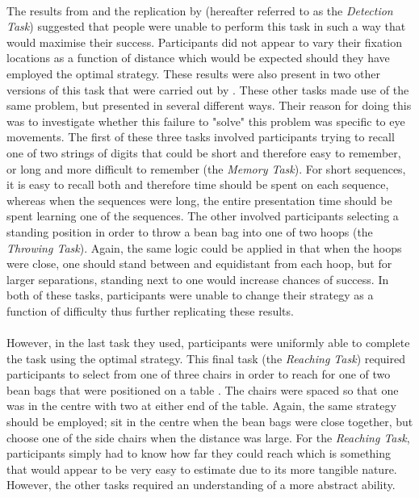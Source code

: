 \documentclass[12pt]{article}
\begin{document}
\paragraph{} The results from \cite{morvan2012human} and the replication by \cite{clarke2015failure} (hereafter referred to as the \textit{Detection Task}) suggested that people were unable to perform this task in such a way that would maximise their success. Participants did not appear to vary their fixation locations as a function of distance which would be expected should they have employed the optimal strategy. These results were also present in two other versions of this task that were carried out by \cite{clarke2015failure}. These other tasks made use of the same problem, but presented in several different ways. Their reason for doing this was to investigate whether this failure to "solve" this problem was specific to eye movements. The first of these three tasks involved participants trying to recall one of two strings of digits that could be short and therefore easy to remember, or long and more difficult to remember (the \textit{Memory Task}). For short sequences, it is easy to recall both and therefore time should be spent on each sequence, whereas when the sequences were long, the entire presentation time should be spent learning one of the sequences. The other involved participants selecting a standing position in order to throw a bean bag into one of two hoops (the \textit{Throwing Task}). Again, the same logic could be applied in that when the hoops were close, one should stand between and equidistant from each hoop, but for larger separations, standing next to one would increase chances of success. In both of these tasks, participants were unable to change their strategy as a function of difficulty thus further replicating these results. 

\paragraph{} However, in the last task they used, participants were uniformly able to complete the task using the optimal strategy. This final task (the \textit{Reaching Task}) required participants to select from one of three chairs in order to reach for one of two bean bags that were positioned on a table \citep{clarke2015failure}. The chairs were spaced so that one was in the centre with two at either end of the table. Again, the same strategy should be employed; sit in the centre when the bean bags were close together, but choose one of the side chairs when the distance was large. For the \textit{Reaching Task}, participants simply had to know how far they could reach which is something that would appear to be very easy to estimate due to its more tangible nature. However, the other tasks required an understanding of a more abstract ability.
\end{document}
